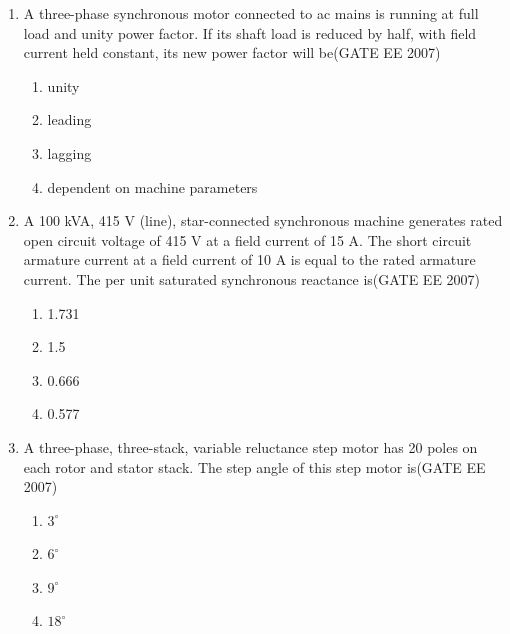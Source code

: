 \documentclass[a4paper,10pt]{exam}
\theoremstyle{remark}
\begin{document}
\begin{enumerate}
\begin{multicols}{4}
\begin{enumerate}
\item 2.43 A
\item 1.65 A
\item1.22 A
\item 1.0 A
 \end{enumerate}
\end{multicols}

\item \quad A three-phase synchronous motor connected to ac mains is running at full load and unity power factor. If its shaft load is reduced by half, with field current held constant, its new power factor will be\hfill{(GATE EE 2007)} 

\begin{multicols}{4}
\begin{enumerate}
\item unity
\item leading
\item lagging
\item dependent on machine parameters
 \end{enumerate}
\end{multicols}

\item \quad A 100 kVA, 415 V (line), star-connected synchronous machine generates rated open circuit voltage of 415 V at a field current of 15 A. The short circuit armature current at a field current of 10 A is equal to the rated armature current. The per unit saturated synchronous reactance is\hfill{(GATE EE 2007)} 

\begin{multicols}{4}
\begin{enumerate}
 \item  1.731
 \item  1.5
 \item  0.666
 \item  0.577
 \end{enumerate}
\end{multicols}

\item \quad A three-phase, three-stack, variable reluctance step motor has 20 poles on each rotor and stator stack. The step angle of this step motor is\hfill{(GATE EE 2007)} 

\begin{multicols}{4}
\begin{enumerate}
   \item  $3^\circ$
   \item  $6^\circ$
   \item  $9^\circ$
   \item  $18^\circ$
   \end{enumerate}
\end{multicols}


\end{enumerate}
\end{document}
